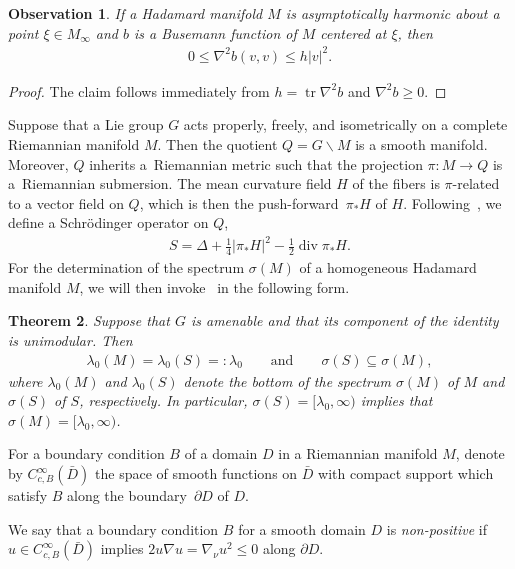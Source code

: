 \documentclass[pdftex]{sigma}
\numberwithin{equation}{section}
\newtheorem{Theorem}{Theorem}[section]
\newtheorem{obs}[Theorem]{Observation}
 { \theoremstyle{definition}
\newtheorem{Definition}[Theorem]{Definition}
\newtheorem{Note}[Theorem]{Note}
\newtheorem{Example}[Theorem]{Example}
\newtheorem{Remark}[Theorem]{Remark}
\newtheorem{exas}[Theorem]{Examples}
\newtheorem{exa}[Theorem]{Example}}
\DeclareMathOperator{\diver}{div}
\DeclareMathOperator{\tr}{tr}
\begin{document}
\begin{obs}\label{obs}
If a Hadamard manifold $M$ is asymptotically harmonic about a point $\xi\in M_\infty$
and $b$ is a Busemann function of $M$ centered at $\xi$, then
\begin{align*}
	0 \le \nabla^2b(v,v) \le h |v|^2.
\end{align*}
\end{obs}

\begin{proof}
The claim follows immediately from $h=\tr\nabla^2b$ and $\nabla^2b\ge0$.
\end{proof}

Suppose that a Lie group $G$ acts properly, freely, and isometrically on a complete Riemannian manifold $M$.
Then the quotient $Q=G\backslash M$ is a smooth manifold.
Moreover, $Q$ inherits a~Riemannian metric such that the projection $\pi\colon M\to Q$ is a~Riemannian submersion.
The mean curvature field $H$ of the fibers is $\pi$-related to a vector field on $Q$,
which is then the push-forward~$\pi_*H$ of $H$.
Following~\cite{P21}, we define a Schr\"odinger operator on $Q$,
\begin{align}\label{pdef}
	S = \Delta + \frac14|\pi_*H|^2 - \frac12\diver\pi_*H.
\end{align}
For the determination of the spectrum $\sigma(M)$ of a homogeneous Hadamard manifold $M$,
we will then invoke~\cite[Theorem 1.3]{P21} in the following form.

\begin{Theorem}\label{p13}
Suppose that $G$ is amenable and that its component of the identity is unimodular.
Then
\begin{align*}
	\lambda_0(M) = \lambda_0(S) =:\lambda_0
	\qquad \text{and} \qquad
	\sigma(S)\subseteq\sigma(M),
\end{align*}
where $\lambda_0(M)$ and $\lambda_0(S)$ denote the bottom of the spectrum $\sigma(M)$ of $M$
and $\sigma(S)$ of $S$, respectively.
In particular, $\sigma(S)=[\lambda_0,\infty)$ implies that $\sigma(M)=[\lambda_0,\infty)$.
\end{Theorem}

For a boundary condition $B$ of a domain $D$ in a Riemannian manifold $M$,
denote by $C^\infty_{c,B}(\bar{D})$ the space of smooth functions on $\bar D$ with compact support
which satisfy $B$ along the boundary~$\partial D$ of $D$.

\begin{Definition}%
We say that a boundary condition $B$ for a smooth domain $D$ is \emph{non-positive}
if~$u\in C^\infty_{c,B}(\bar D)$ implies $2u\nabla u=\nabla_\nu u^2\le0$ along $\partial D$.
\end{Definition}
\end{document}
